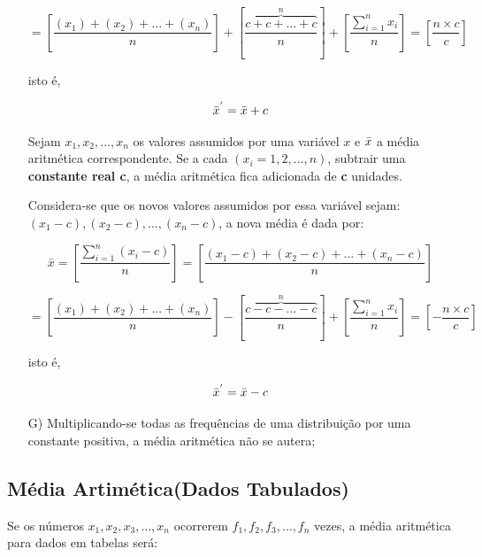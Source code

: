 \begin{enumerate}
\begin{equation*}\label{media4}
  = \left[ \frac{(x_{1})+(x_{2})+...+(x_{n})}{n} \right] +  \left[ \overbrace{\frac{c+c+...+c}{n}}^{n} \right]+ 
 \left[ \frac{\sum_{i=1}^{n}x_{i}}{n}\right] = \left[ \frac{n \times c}{c} \right]
\end{equation*}

isto é, 

$$\Bar{x}^{'}=\Bar{x}+c$$



\vskip0.3cm
\textbf{} 
\vskip0.3cm

Sejam $x_{1}, x_{2},...,x_{n}$ os valores assumidos por uma variável $x$ e $\Bar{x}$ a média aritmética correspondente. Se a cada $(x_{i}=1,2,...,n)$, subtrair uma \textbf{constante real c}, a média aritmética fica adicionada de \textbf{c} unidades.\vskip0.3cm


Considera-se que os novos valores assumidos por essa variável sejam: $(x_{1}-c),(x_{2}-c),...,(x_{n}-c)$, a nova média é dada por:


\begin{equation}\label{media3}
     \bar{x} = \left[ \frac{\sum_{i=1}^{n}(x_{i}-c)}{n} \right] = \left[ \frac{(x_{1}-c)+(x_{2}-c)+...+(x_{n}-c)}{n} \right] 
\end{equation}

\begin{equation*}\label{media4}
  = \left[ \frac{(x_{1})+(x_{2})+...+(x_{n})}{n} \right] - \left[ \overbrace{\frac{c-c-...-c}{n}}^{n} \right] + \left[ \frac{\sum_{i=1}^{n}x_{i}}{n} \right] = \left[ - \frac{n \times c}{c} \right]
\end{equation*}

isto é, 

$$\Bar{x}^{'}=\Bar{x}-c$$


\item [{G)}]Multiplicando-se todas as frequências de uma distribuição por uma constante positiva, a média aritmética não se autera; 
\end{enumerate}


\subsection{Média Artimética(Dados Tabulados)}

Se os números $x_{1},x_{2},x_{3},\ldots, x_{n}$ ocorrerem $f_{1}, f_{2}, f_{3}, \ldots, f_{n}$ vezes, a média aritmética para dados em tabelas será:


